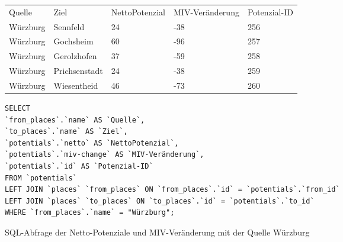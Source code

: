 \begin{tabularx}{\textwidth}{*5{X}}
Quelle & Ziel & NettoPotenzial & MIV-Veränderung & Potenzial-ID\\ 
Würzburg & Sennfeld & 24 & -38 & 256\\ 
Würzburg & Gochsheim & 60 & -96 & 257\\ 
Würzburg & Gerolzhofen & 37 & -59 & 258\\ 
Würzburg & Prichsenstadt & 24 & -38 & 259\\ 
Würzburg & Wiesentheid & 46 & -73 & 260\\ 
\end{tabularx}
\newline
\newline
\begin{listing}[htbp]
\begin{verbatim}
SELECT
`from_places`.`name` AS `Quelle`, 
`to_places`.`name` AS `Ziel`, 
`potentials`.`netto` AS `NettoPotenzial`, 
`potentials`.`miv-change` AS `MIV-Veränderung`, 
`potentials`.`id` AS `Potenzial-ID`
FROM `potentials`
LEFT JOIN `places` `from_places` ON `from_places`.`id` = `potentials`.`from_id`
LEFT JOIN `places` `to_places` ON `to_places`.`id` = `potentials`.`to_id`
WHERE `from_places`.`name` = "Würzburg";
\end{verbatim}
\caption{SQL-Abfrage der Netto-Potenziale und MIV-Veränderung mit der Quelle Würzburg}\label{lst-fz-wuerzburg}
\end{listing}